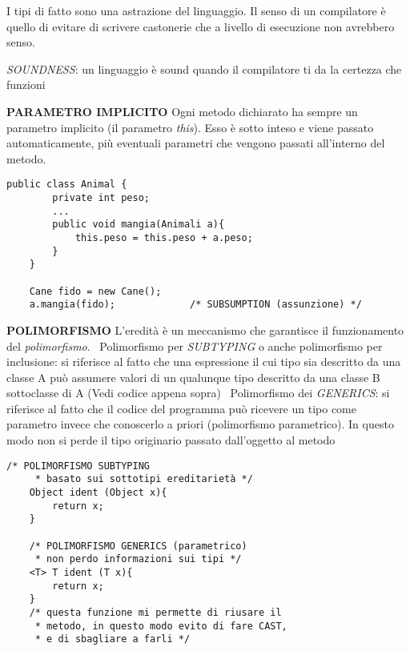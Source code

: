 \noindent I tipi di fatto sono una astrazione del linguaggio. \newline
Il senso di un compilatore è quello di evitare di scrivere castonerie che a livello di esecuzione non avrebbero senso.

\noindent \textit{SOUNDNESS}: un linguaggio è sound quando il compilatore ti da la certezza che funzioni

\noindent \textbf{PARAMETRO IMPLICITO} \newline
 Ogni metodo dichiarato ha sempre un parametro implicito (il parametro \textit{this}). Esso è sotto inteso e viene passato automaticamente, più eventuali parametri che vengono passati all'interno del metodo.
\begin{lstlisting}[basicstyle=\small,]
	public class Animal {
		private int peso;
		...
		public void mangia(Animali a){
			this.peso = this.peso + a.peso;
		}
	}
	
	Cane fido = new Cane();
	a.mangia(fido); 			/* SUBSUMPTION (assunzione)	*/
\end{lstlisting}

\noindent \textbf{POLIMORFISMO} \newline
L'eredità è un meccanismo che garantisce il funzionamento del \textit{polimorfismo}.\newline
\textbullet\ Polimorfismo per \textit{SUBTYPING} o anche polimorfismo per inclusione: si riferisce al fatto che una espressione il cui tipo sia descritto da una classe A può assumere valori di un qualunque tipo descritto da una classe B sottoclasse di A (Vedi codice appena sopra)\newline 
\textbullet\ Polimorfismo dei \textit{GENERICS}: si riferisce al fatto che il codice del programma può ricevere un tipo come parametro invece che conoscerlo a priori (polimorfismo parametrico). In questo modo non si perde il tipo originario passato dall'oggetto al metodo \newline
\begin{lstlisting}[basicstyle=\small,]
	/* POLIMORFISMO SUBTYPING
	 * basato sui sottotipi ereditarietà */
	Object ident (Object x){
		return x;
	}

	/* POLIMORFISMO GENERICS (parametrico)
	 * non perdo informazioni sui tipi */
	<T> T ident (T x){
		return x;
	}
	/* questa funzione mi permette di riusare il 
	 * metodo, in questo modo evito di fare CAST,
	 * e di sbagliare a farli */
\end{lstlisting}

\newpage

